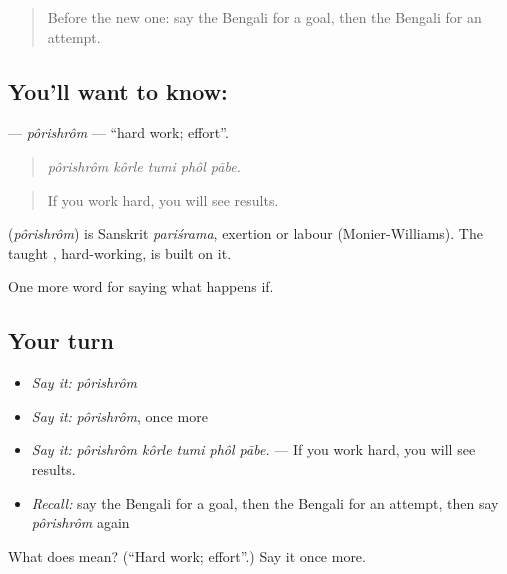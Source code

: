 \begin{quote}
Before the new one: say the Bengali for a goal, then the Bengali for an attempt.
\end{quote}

\subsection*{You'll want to know: }
\textbf{} — \emph{pôrishrôm} — \textquotedblleft{}hard work; effort\textquotedblright{}.

\begin{quote}
    
\end{quote}

\begin{quote}
\emph{pôrishrôm kôrle tumi phôl pābe.}
\end{quote}

\begin{quote}
If you work hard, you will see results.
\end{quote}

\begin{cousinweb}
\textbf{} (\emph{pôrishrôm}) is Sanskrit \emph{pariśrama}, exertion or labour (Monier-Williams). The taught , hard-working, is built on it.
\end{cousinweb}

\begin{grammarlens}[title={What you've built}]
One more word for saying what happens if.
\end{grammarlens}

\subsection*{Your turn}
\begin{itemize}
\raggedright
  \item \emph{Say it:} \emph{pôrishrôm}
  \item \emph{Say it:} \emph{pôrishrôm}, once more
  \item \emph{Say it:} \emph{pôrishrôm kôrle tumi phôl pābe.} — If you work hard, you will see results.
  \item \emph{Recall:} say the Bengali for a goal, then the Bengali for an attempt, then say \emph{pôrishrôm} again
\end{itemize}

\begin{tcolorbox}[breakable,colback=teal!4,colframe=teal!35!black,title={Before you move on}]
What does  mean? (\textquotedblleft{}Hard work; effort\textquotedblright{}.) Say it once more.
\end{tcolorbox}
